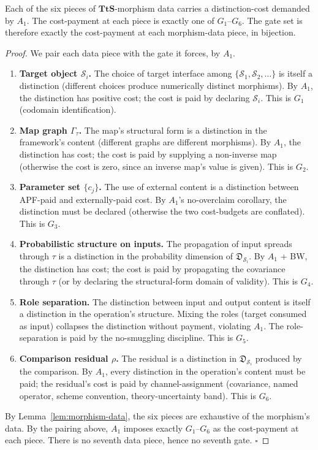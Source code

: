 \begin{theorem}
\label{thm:A1-forced}
Each of the six pieces of $\mathbf{TtS}$-morphism data carries a distinction-cost demanded by $A_1$. The cost-payment at each piece is exactly one of $G_1$--$G_6$. The gate set is therefore exactly the cost-payment at each morphism-data piece, in bijection.
\end{theorem}

\begin{proof}
We pair each data piece with the gate it forces, by $A_1$.

\begin{enumerate}
\item \textbf{Target object $\mathcal{S}_i$.} The choice of target interface among $\{\mathcal{S}_1, \mathcal{S}_2, \dots\}$ is itself a distinction (different choices produce numerically distinct morphisms). By $A_1$, the distinction has positive cost; the cost is paid by declaring $\mathcal{S}_i$. This is $G_1$ (codomain identification).
\item \textbf{Map graph $\Gamma_\tau$.} The map's structural form is a distinction in the framework's content (different graphs are different morphisms). By $A_1$, the distinction has cost; the cost is paid by supplying a non-inverse map (otherwise the cost is zero, since an inverse map's value is given). This is $G_2$.
\item \textbf{Parameter set $\{c_j\}$.} The use of external content is a distinction between APF-paid and externally-paid cost. By $A_1$'s no-overclaim corollary, the distinction must be declared (otherwise the two cost-budgets are conflated). This is $G_3$.
\item \textbf{Probabilistic structure on inputs.} The propagation of input spreads through $\tau$ is a distinction in the probability dimension of $\mathfrak{D}_{\mathcal{S}_i}$. By $A_1$ + BW, the distinction has cost; the cost is paid by propagating the covariance through $\tau$ (or by declaring the structural-form domain of validity). This is $G_4$.
\item \textbf{Role separation.} The distinction between input and output content is itself a distinction in the operation's structure. Mixing the roles (target consumed as input) collapses the distinction without payment, violating $A_1$. The role-separation is paid by the no-smuggling discipline. This is $G_5$.
\item \textbf{Comparison residual $\rho$.} The residual is a distinction in $\mathfrak{D}_{\mathcal{S}_i}$ produced by the comparison. By $A_1$, every distinction in the operation's content must be paid; the residual's cost is paid by channel-assignment (covariance, named operator, scheme convention, theory-uncertainty band). This is $G_6$.
\end{enumerate}

By Lemma~\ref{lem:morphism-data}, the six pieces are exhaustive of the morphism's data. By the pairing above, $A_1$ imposes exactly $G_1$--$G_6$ as the cost-payment at each piece. There is no seventh data piece, hence no seventh gate. $\square$
\end{proof}

